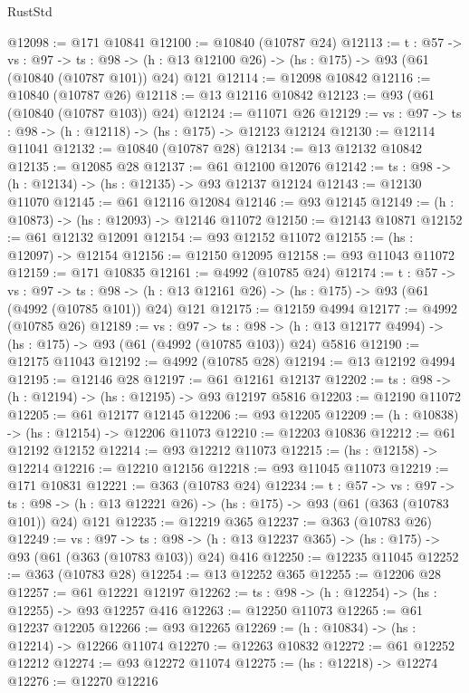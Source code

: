 \begin{lexlean}{RustStd}
\begin{coremodule}
@12098 := @171 @10841
@12100 := @10840 (@10787 @24)
@12113 := {t : @57} ->
  {vs : @97} ->
  {ts : @98} -> (h : @13 @12100 @26) -> (hs : @175) -> @93 (@61 (@10840 (@10787 @101)) @24) @121
@12114 := @12098 @10842
@12116 := @10840 (@10787 @26)
@12118 := @13 @12116 @10842
@12123 := @93 (@61 (@10840 (@10787 @103)) @24)
@12124 := @11071 @26
@12129 := {vs : @97} -> {ts : @98} -> (h : @12118) -> (hs : @175) -> @12123 @12124
@12130 := @12114 @11041
@12132 := @10840 (@10787 @28)
@12134 := @13 @12132 @10842
@12135 := @12085 @28
@12137 := @61 @12100 @12076
@12142 := {ts : @98} -> (h : @12134) -> (hs : @12135) -> @93 @12137 @12124
@12143 := @12130 @11070
@12145 := @61 @12116 @12084
@12146 := @93 @12145
@12149 := (h : @10873) -> (hs : @12093) -> @12146 @11072
@12150 := @12143 @10871
@12152 := @61 @12132 @12091
@12154 := @93 @12152 @11072
@12155 := (hs : @12097) -> @12154
@12156 := @12150 @12095
@12158 := @93 @11043 @11072
@12159 := @171 @10835
@12161 := @4992 (@10785 @24)
@12174 := {t : @57} ->
  {vs : @97} ->
  {ts : @98} -> (h : @13 @12161 @26) -> (hs : @175) -> @93 (@61 (@4992 (@10785 @101)) @24) @121
@12175 := @12159 @4994
@12177 := @4992 (@10785 @26)
@12189 := {vs : @97} ->
  {ts : @98} -> (h : @13 @12177 @4994) -> (hs : @175) -> @93 (@61 (@4992 (@10785 @103)) @24) @5816
@12190 := @12175 @11043
@12192 := @4992 (@10785 @28)
@12194 := @13 @12192 @4994
@12195 := @12146 @28
@12197 := @61 @12161 @12137
@12202 := {ts : @98} -> (h : @12194) -> (hs : @12195) -> @93 @12197 @5816
@12203 := @12190 @11072
@12205 := @61 @12177 @12145
@12206 := @93 @12205
@12209 := (h : @10838) -> (hs : @12154) -> @12206 @11073
@12210 := @12203 @10836
@12212 := @61 @12192 @12152
@12214 := @93 @12212 @11073
@12215 := (hs : @12158) -> @12214
@12216 := @12210 @12156
@12218 := @93 @11045 @11073
@12219 := @171 @10831
@12221 := @363 (@10783 @24)
@12234 := {t : @57} ->
  {vs : @97} ->
  {ts : @98} -> (h : @13 @12221 @26) -> (hs : @175) -> @93 (@61 (@363 (@10783 @101)) @24) @121
@12235 := @12219 @365
@12237 := @363 (@10783 @26)
@12249 := {vs : @97} ->
  {ts : @98} -> (h : @13 @12237 @365) -> (hs : @175) -> @93 (@61 (@363 (@10783 @103)) @24) @416
@12250 := @12235 @11045
@12252 := @363 (@10783 @28)
@12254 := @13 @12252 @365
@12255 := @12206 @28
@12257 := @61 @12221 @12197
@12262 := {ts : @98} -> (h : @12254) -> (hs : @12255) -> @93 @12257 @416
@12263 := @12250 @11073
@12265 := @61 @12237 @12205
@12266 := @93 @12265
@12269 := (h : @10834) -> (hs : @12214) -> @12266 @11074
@12270 := @12263 @10832
@12272 := @61 @12252 @12212
@12274 := @93 @12272 @11074
@12275 := (hs : @12218) -> @12274
@12276 := @12270 @12216

\end{coremodule}
\end{lexlean}
